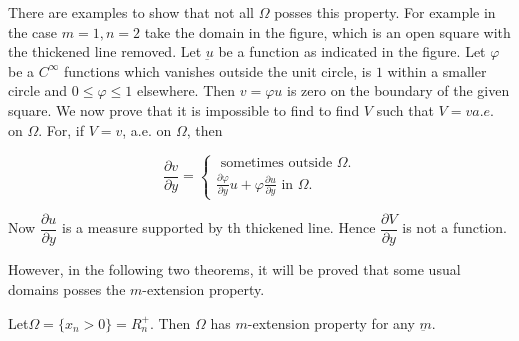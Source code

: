 \noindent 
\begin{minipage}{6cm}
  There are examples to show that not all $\Omega$ posses this
  property. For example in the case $m=1,n=2$ take the domain in the
  figure, which is an open square with the thickened line removed. Let
  $\underbar{u}$ be a function as indicated in the figure. Let $\varphi$
  be a $C^ \infty$ functions which vanishes outside the unit circle, is
  $1$ within a smaller circle and $0 \leq \varphi \le 1$ elsewhere. Then $v =
  \varphi u$ is zero on the boundary of the given square. We now prove
  that it is impossible to find to find $V$ such that $V=va.e$. on
  $\Omega$. For, if $V=v$, a.e. on $\Omega$, then 
\end{minipage}
\quad 
\begin{minipage}{4cm}
  \begin{figure}[H]
  \end{figure}
\end{minipage}
\begin{equation*}
  \frac{\partial v}{\partial y}=
  \begin{cases}
    \text{ sometimes outside } \Omega.\\ 
    \frac{\partial \varphi}{\partial
      y}u + \varphi \frac{\partial u}{\partial y} \text { in } \Omega. 
  \end{cases}
\end{equation*}

Now $\dfrac{\partial u}{\partial y}$ is a measure supported by th
thickened line. Hence $\dfrac{\partial V}{\partial y}$ is not a
function. 

However, in the following two theorems, it will be proved that some
usual domains posses the $m$-extension property. 

\begin{theorem}\label{lec3:sec2:subsec2:thm2.3}%
  Let\pageoriginale $\Omega = \{ x_n >0 \} =R^+_n$. Then $\Omega$ has $m$-extension
  property for any $\underbar{m}$. 
\end{theorem}

